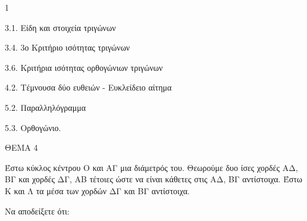 \begin{ylh}{1}
    \item 3.1. Είδη και στοιχεία τριγώνων
    \item 3.4. 3ο Κριτήριο ισότητας τριγώνων
    \item 3.6. Κριτήρια ισότητας ορθογώνιων τριγώνων
    \item 4.2. Τέμνουσα δύο ευθειών - Ευκλείδειο αίτημα
    \item 5.2. Παραλληλόγραμμα
    \item 5.3. Ορθογώνιο.
\end{ylh}

ΘΕΜΑ 4

Έστω κύκλος κέντρου Ο και ΑΓ μια διάμετρός του. Θεωρούμε δυο ίσες χορδές ΑΔ, ΒΓ και χορδές ΔΓ, ΑΒ τέτοιες ώστε να είναι κάθετες στις ΑΔ, ΒΓ αντίστοιχα. Έστω Κ και Λ τα μέσα των χορδών ΔΓ και ΒΓ αντίστοιχα.

Να αποδείξετε ότι:

